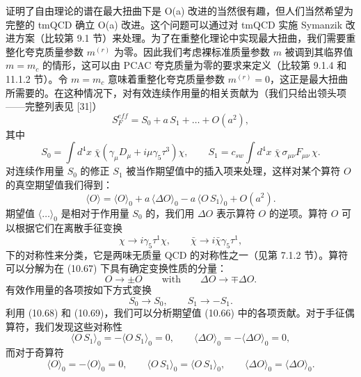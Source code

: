 证明了自由理论的谱在最大扭曲下是 O(a) 改进的当然很有趣，但人们当然希望为完整的 tmQCD 确立 O(a) 改进。这个问题可以通过对 tmQCD 实施 Symanzik 改进方案（比较第 9.1 节）来处理。为了在重整化理论中实现最大扭曲，我们需要重整化夸克质量参数 $m^{(r)}$ 为零。因此我们考虑裸标准质量参数 $m$ 被调到其临界值 $m = m_c$ 的情形，这可以由 PCAC 夸克质量为零的要求来定义（比较第 9.1.4 和 11.1.2 节）。令 $m = m_c$ 意味着重整化夸克质量参数 $m^{(r)} = 0$，这正是最大扭曲所需要的。在这种情况下，对有效连续作用量的相关贡献为（我们只给出领头项——完整列表见 [31]）
\begin{equation}
  S_F^{eff} = S_0 + a\,S_1 + \ldots + O(a^2) ,
\end{equation}
其中
\begin{equation}
  S_0 = \int d^4x\;
  \bar\chi\left(\gamma_\mu D_\mu + i\mu\gamma_5\tau^3\right)\chi , \qquad
  S_1 = c_{sw}\int d^4x\; \bar\chi\,\sigma_{\mu\nu}F_{\mu\nu}\,\chi .
\end{equation}
对连续作用量 $S_0$ 的修正 $S_1$ 被当作期望值中的插入项来处理，这样对某个算符 $O$ 的真空期望值我们得到：
\begin{equation}
  \langle O\rangle = \langle O\rangle_0 + a\,\langle\Delta O\rangle_0
  - a\,\langle O\,S_1\rangle_0 + O(a^2) .
\end{equation}
期望值 $\langle\ldots\rangle_0$ 是相对于作用量 $S_0$ 的，我们用 $\Delta O$ 表示算符 $O$ 的逆项。算符 $O$ 可以根据它们在离散手征变换
\begin{equation}
  \chi \longrightarrow i\gamma_5\tau^1\chi , \qquad
  \bar\chi \longrightarrow i\bar\chi\gamma_5\tau^1 ,
\end{equation}
下的对称性来分类，它是两味无质量 QCD 的对称性之一（见第 7.1.2 节）。算符可以分解为在 (10.67) 下具有确定变换性质的分量：
\begin{equation}
  O \longrightarrow \pm O \qquad \text{with} \qquad
  \Delta O \longrightarrow \mp\Delta O .
\end{equation}
有效作用量的各项按如下方式变换
\begin{equation}
  S_0 \longrightarrow S_0 , \qquad S_1 \longrightarrow -S_1 .
\end{equation}
利用 (10.68) 和 (10.69)，我们可以分析期望值 (10.66) 中的各项贡献。对于手征偶算符，我们发现这些对称性
\begin{equation}
  \langle O\,S_1\rangle_0 = -\langle O\,S_1\rangle_0 = 0 , \qquad
  \langle\Delta O\rangle_0 = -\langle\Delta O\rangle_0 = 0 ,
\end{equation}
而对于奇算符
\begin{equation}
  \langle O\rangle_0 = -\langle O\rangle_0 = 0 , \qquad
  \langle O\,S_1\rangle_0 = \langle O\,S_1\rangle_0 , \qquad
  \langle\Delta O\rangle_0 = \langle\Delta O\rangle_0 .
\end{equation}
